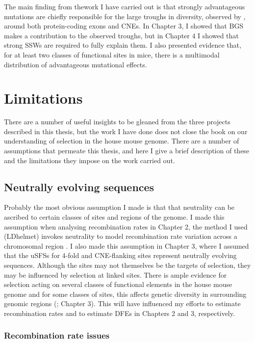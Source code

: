 	The main finding from thework I have carried out is that strongly advantageous mutations are chiefly responsible for the large troughs in diversity, observed by \cite{RN122}, around both protein-coding exons and CNEs. In Chapter 3, I showed that BGS makes a contribution to the observed troughs, but in Chapter 4 I showed that strong SSWs are required to fully explain them. I also presented evidence that, for at least two classes of functional sites in mice, there is a multimodal distribution of advantageous mutational effects. 
	 
\section{Limitations}

	There are a number of useful insights to be gleaned from the three projects described in this thesis, but the work I have done does not close the book on our understanding of selection in the house mouse genome. There are a number of assumptions that permeate this thesis, and here I give a brief description of these and the limitations they impose on the work carried out.
 
\subsection{Neutrally evolving sequences}

	 Probably the most obvious assumption I made is that that neutrality can be ascribed to certain classes of sites and regions of the genome. I made this assumption when analysing recombination rates in Chapter 2, the method I used (LDhelmet) invokes neutrality to model recombination rate variation across a chromosomal region \citep{RN213}. I also made this assumption in Chapter 3, where I assumed that the uSFSs for 4-fold and CNE-flanking sites represent neutrally evolving sequences. Although the sites may not themselves be the targets of selection, they may be influenced by selection at linked sites. There is ample evidence for selection acting on several classes of functional elements in the house mouse genome \citep{RN342, RN170} and for some classes of sites, this affects genetic diversity in surrounding genomic regions (\citealt{RN122}; Chapter 3). This will have influenced my efforts to estimate recombination rates and to estimate DFEs in Chapters 2 and 3, respectively.

\subsubsection{Recombination rate issues}

